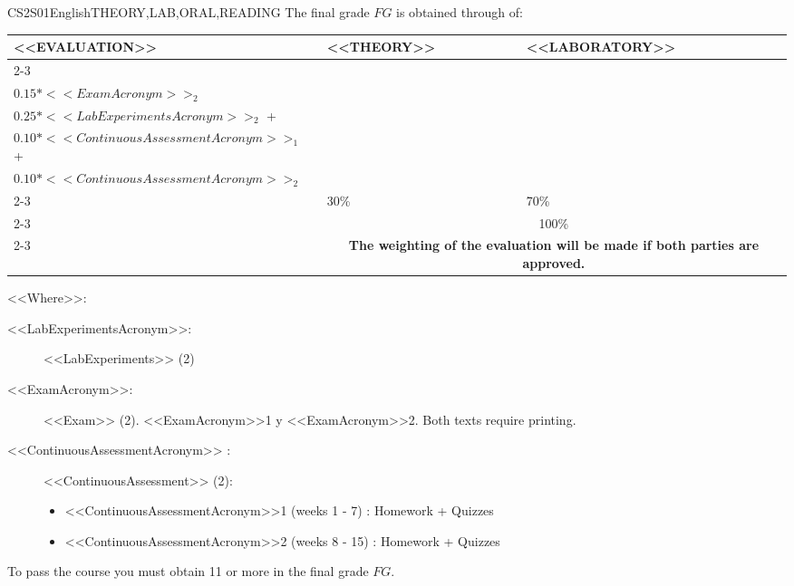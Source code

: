   \begin{evaluation}{CS2S01}{English}{THEORY,LAB,ORAL,READING}
  The final grade $FG$ is obtained through of:
 
  \begin{tabularx}{0.9\textwidth}{|X|p{}|p{}|} \hline
  \multirow{4}{*}{\uppercase{<<Evaluation>>}} & \uppercase{<<Theory>>} & \uppercase{<<Laboratory>>} \\ \cline{2-3}
  & %
      \begin{minipage}{0.95\textwidth}
      \begin{tabular}{l}
          $0.15*<<ExamAcronym>>_{1}$ + \\
          $0.15*<<ExamAcronym>>_{2}$
          \end{tabular} 
      \end{minipage} 
  & %
      \begin{minipage}{0.95\textwidth}
      \begin{tabular}{l}
          $0.25*<<LabExperimentsAcronym>>_{1}$ + \\
          $0.25*<<LabExperimentsAcronym>>_{2}$ + \\
          $0.10*<<ContinuousAssessmentAcronym>>_{1}$ + \\
          $0.10*<<ContinuousAssessmentAcronym>>_{2}$
      \end{tabular} 
      \end{minipage}                 \\ \cline{2-3}
  & %
  30\% 
  & %
  70\% \\ \cline{2-3}
  & \multicolumn{2}{c|}{100\%}  \\ \cline{2-3}
  & \multicolumn{2}{c|}{\textbf{\textbf{The weighting of the evaluation will be made if both parties are approved.}}}  \\ \hline
  \end{tabularx}
      
  \vspace{2mm}
  \noindent <<Where>>:
  \begin{description}
    \item[<<LabExperimentsAcronym>>:] <<LabExperiments>> (2)
    \item[<<ExamAcronym>>:] <<Exam>> (2). <<ExamAcronym>>1 y <<ExamAcronym>>2. Both texts require printing.
    \item[<<ContinuousAssessmentAcronym>> :] <<ContinuousAssessment>> (2):
      \begin{itemize}
        \item  <<ContinuousAssessmentAcronym>>1 (weeks 1 - 7) :  Homework + Quizzes
        \item <<ContinuousAssessmentAcronym>>2 (weeks 8 - 15) : Homework + Quizzes
      \end{itemize}
  \end{description}

  \noindent To pass the course you must obtain 11 or more in the final grade $FG$.
  \end{evaluation}

